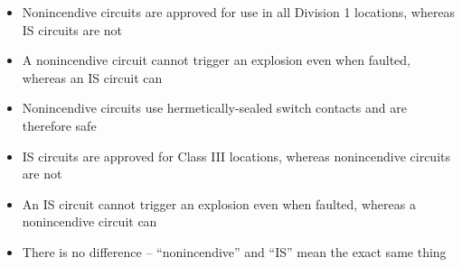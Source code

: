 \begin{itemize}
\item{} Nonincendive circuits are approved for use in all Division 1 locations, whereas IS circuits are not
\vskip 5pt 
\item{} A nonincendive circuit cannot trigger an explosion even when faulted, whereas an IS circuit can
\vskip 5pt 
\item{} Nonincendive circuits use hermetically-sealed switch contacts and are therefore safe
\vskip 5pt 
\item{} IS circuits are approved for Class III locations, whereas nonincendive circuits are not
\vskip 5pt 
\item{} An IS circuit cannot trigger an explosion even when faulted, whereas a nonincendive circuit can
\vskip 5pt 
\item{} There is no difference -- ``nonincendive'' and ``IS'' mean the exact same thing
\end{itemize}





